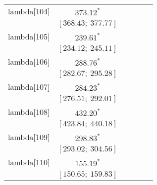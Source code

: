 \begin{table}
\begin{center}
\begin{tabular}{l c c c c c }
lambda[104] & $373.12^{*}$                     &                           &                           &                         &                         \\
            & $[368.43;\ 377.77]$              &                           &                           &                         &                         \\
lambda[105] & $239.61^{*}$                     &                           &                           &                         &                         \\
            & $[234.12;\ 245.11]$              &                           &                           &                         &                         \\
lambda[106] & $288.76^{*}$                     &                           &                           &                         &                         \\
            & $[282.67;\ 295.28]$              &                           &                           &                         &                         \\
lambda[107] & $284.23^{*}$                     &                           &                           &                         &                         \\
            & $[276.51;\ 292.01]$              &                           &                           &                         &                         \\
lambda[108] & $432.20^{*}$                     &                           &                           &                         &                         \\
            & $[423.84;\ 440.18]$              &                           &                           &                         &                         \\
lambda[109] & $298.83^{*}$                     &                           &                           &                         &                         \\
            & $[293.02;\ 304.56]$              &                           &                           &                         &                         \\
lambda[110] & $155.19^{*}$                     &                           &                           &                         &                         \\
            & $[150.65;\ 159.83]$              &                           &                           &                         &                         \\

\end{tabular}
\end{center}
\end{table}
